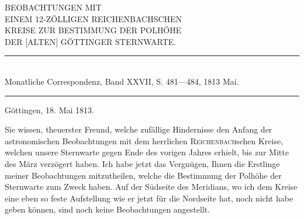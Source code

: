 \clearpage\begingroup

\newfontfamily{}
\newcommand{\ReichenbachBeta}{\text{\ReichenbachGreek ϐ}}
\NoSourceHead
\begin{center}\large
BEOBACHTUNGEN MIT\\
EINEM 12-ZÖLLIGEN REICHENBACHSCHEN\\
KREISE ZUR BESTIMMUNG DER POLHÖHE\\
DER [ALTEN] GÖTTINGER STERNWARTE.
\end{center}
\begin{center}\small
\rule{.78\textwidth}{.35pt}\\[.2em]
Monatliche Correspondenz, Band XXVII, S. 481—484, 1813 Mai.\\[-.2em]
\rule{.78\textwidth}{.35pt}
\end{center}
\begin{center}\quad Göttingen, 18. Mai 1813.\end{center}
\noindent\hspace*{\parindent}Sie wissen, theuerster Freund, welche zufällige Hindernisse den Anfang der astronomischen Beobachtungen mit dem herrlichen \textsc{Reichenbach}schen Kreise, welchen unsere Sternwarte gegen Ende des vorigen Jahres erhielt, bis zur Mitte des März verzögert haben. Ich habe jetzt das Vergnügen, Ihnen die Erstlinge meiner Beobachtungen mitzutheilen, welche die Bestimmung der Polhöhe der Sternwarte zum Zweck haben. Auf der Südseite des Meridians, wo ich dem Kreise eine eben so feste Aufstellung wie er jetzt für die Nordseite hat, noch nicht habe geben können, sind noch keine Beobachtungen angestellt.
